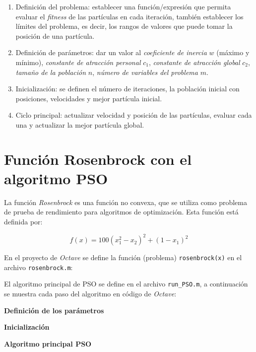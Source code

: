 \documentclass[12pt, a4paper]{article}
\begin{document}
        \begin{enumerate}
            \item Definición del problema: establecer una función/expresión que permita evaluar el \emph{fitness} de las partículas en cada iteración, también establecer los límites del problema, es decir, los rangos de valores que puede tomar la posición de una partícula.
            \item Definición de parámetros: dar un valor al \emph{coeficiente de inercia} \(w\) (máximo y mínimo), \emph{constante de atracción personal} \(c_1\), \emph{constante de atracción global} \(c_2\), \emph{tamaño de la población} \(n\), \emph{número de variables del problema} \(m\).
            \item Inicialización: se definen el número de iteraciones, la población inicial con posiciones, velocidades y mejor partícula inicial.
            \item Ciclo principal: actualizar velocidad y posición de las partículas, evaluar cada una y actualizar la mejor partícula global.
        \end{enumerate}
    
    \section{Función Rosenbrock con el algoritmo PSO}
        La función \emph{Rosenbrock} es una función no convexa, que se utiliza como problema de prueba de rendimiento para algoritmos de optimización. Esta función está definida por:

        \begin{equation}
            f(x)=100(x_1^2-x_2)^2+(1-x_1)^2
        \end{equation}

        En el proyecto de \emph{Octave} se define la función (problema) \lstinline{rosenbrock(x)} en el archivo \lstinline{rosenbrock.m}:
        
        

        El algoritmo principal de PSO se define en el archivo \lstinline{run_PSO.m}, a continuación se muestra cada paso del algoritmo en código de \emph{Octave}:

        \textbf{Definición de los parámetros}
        

        \textbf{Inicialización}
        

        \textbf{Algoritmo principal PSO}
        
\end{document}
